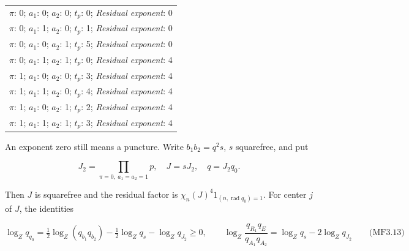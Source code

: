 \begingroup\small
\begin{longtable}{@{}p{\linewidth}@{}}
\toprule
\endhead
\bottomrule
\endlastfoot
\textit{\(\pi\)}: 0; \enspace \textit{\(a_1\)}: 0; \enspace \textit{\(a_2\)}: 0; \enspace \textit{\(t_p\)}: 0; \enspace \textit{Residual exponent}: 0 \\
\addlinespace[3pt]
\textit{\(\pi\)}: 0; \enspace \textit{\(a_1\)}: 1; \enspace \textit{\(a_2\)}: 0; \enspace \textit{\(t_p\)}: 1; \enspace \textit{Residual exponent}: 0 \\
\addlinespace[3pt]
\textit{\(\pi\)}: 0; \enspace \textit{\(a_1\)}: 0; \enspace \textit{\(a_2\)}: 1; \enspace \textit{\(t_p\)}: 5; \enspace \textit{Residual exponent}: 0 \\
\addlinespace[3pt]
\textit{\(\pi\)}: 0; \enspace \textit{\(a_1\)}: 1; \enspace \textit{\(a_2\)}: 1; \enspace \textit{\(t_p\)}: 0; \enspace \textit{Residual exponent}: 4 \\
\addlinespace[3pt]
\textit{\(\pi\)}: 1; \enspace \textit{\(a_1\)}: 0; \enspace \textit{\(a_2\)}: 0; \enspace \textit{\(t_p\)}: 3; \enspace \textit{Residual exponent}: 4 \\
\addlinespace[3pt]
\textit{\(\pi\)}: 1; \enspace \textit{\(a_1\)}: 1; \enspace \textit{\(a_2\)}: 0; \enspace \textit{\(t_p\)}: 4; \enspace \textit{Residual exponent}: 4 \\
\addlinespace[3pt]
\textit{\(\pi\)}: 1; \enspace \textit{\(a_1\)}: 0; \enspace \textit{\(a_2\)}: 1; \enspace \textit{\(t_p\)}: 2; \enspace \textit{Residual exponent}: 4 \\
\addlinespace[3pt]
\textit{\(\pi\)}: 1; \enspace \textit{\(a_1\)}: 1; \enspace \textit{\(a_2\)}: 1; \enspace \textit{\(t_p\)}: 3; \enspace \textit{Residual exponent}: 4 \\
\end{longtable}
\endgroup

An exponent zero still means a puncture. Write \(b_1b_2=q^2s\), \(s\) squarefree, and put

\[
J_2=\prod_{\pi=0,\ a_1=a_2=1}p,
\quad J=sJ_2,\quad q=J_2q_0.
\]

Then \(J\) is squarefree and the residual factor is \(\chi_n(J)^4 1_{(n,\operatorname{rad}q_0)=1}\). For center \(j\) of \(J\), the identities

\hypertarget{mf:eq:B3.13}{}

\label{mf:eq:B3.13}

\[
\log_Zq_{q_0}=\tfrac12\log_Z(q_{b_1}q_{b_2})
 -\tfrac12\log_Zq_s-\log_Zq_{J_2}\ge0,
\qquad
\log_Z\frac{q_{R_1}q_E}{q_{A_1}q_{A_2}}
=\log_Zq_s-2\log_Zq_{J_2}
\qquad\text{(MF3.13)}
\]

